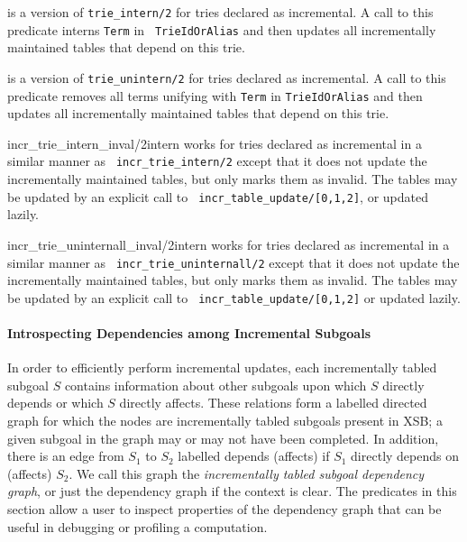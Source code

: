 \begin{description}
%
is a version of {\tt trie\_intern/2} for tries declared as
incremental.  A call to this predicate interns {\tt Term} in {\tt
  TrieIdOrAlias} and then updates all incrementally maintained tables
that depend on this trie.

%
is a version of {\tt trie\_unintern/2} for tries declared as
incremental.  A call to this predicate removes all terms unifying with
{\tt Term} in {\tt TrieIdOrAlias} and then updates all incrementally
maintained tables that depend on this trie.

{incr\_trie\_intern\_inval/2}{intern}
%
works for tries declared as incremental in a similar manner as {\tt
  incr\_trie\_intern/2} except that it does not update the
incrementally maintained tables, but only marks them as invalid. The
tables may be updated by an explicit call to {\tt
  incr\_table\_update/[0,1,2]}, or updated lazily.

{incr\_trie\_uninternall\_inval/2}{intern}
%
works for tries declared as incremental in a similar manner as {\tt
  incr\_trie\_uninternall/2} except that it does not update the
incrementally maintained tables, but only marks them as invalid. The
tables may be updated by an explicit call to {\tt
  incr\_table\_update/[0,1,2]} or updated lazily.
\end{description}

\paragraph{Introspecting Dependencies among Incremental Subgoals}
%
In order to efficiently perform incremental updates, each
incrementally tabled subgoal $S$ contains information about other
subgoals upon which $S$ directly depends or which $S$ directly
affects.  These relations form a labelled directed graph for which the
nodes are incrementally tabled subgoals present in XSB; a given
subgoal in the graph may or may not have been completed.  In addition,
there is an edge from $S_1$ to $S_2$ labelled depends (affects) if
$S_1$ directly depends on (affects) $S_2$.  We call this graph the
{\em incrementally tabled subgoal dependency graph}, or just the
dependency graph if the context is clear.  The predicates in this
section allow a user to inspect properties of the dependency graph
that can be useful in debugging or profiling a computation.

